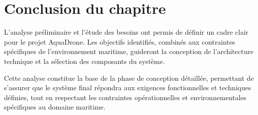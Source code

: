 {\section{Conclusion du chapitre}
L'analyse préliminaire et l'étude des besoins ont permis de définir un cadre clair pour le projet AquaDrone. Les objectifs identifiés, combinés aux contraintes spécifiques de l'environnement maritime, guideront la conception de l'architecture technique et la sélection des composants du système.

Cette analyse constitue la base de la phase de conception détaillée, permettant de s'assurer que le système final répondra aux exigences fonctionnelles et techniques définies, tout en respectant les contraintes opérationnelles et environnementales spécifiques au domaine maritime.

} 